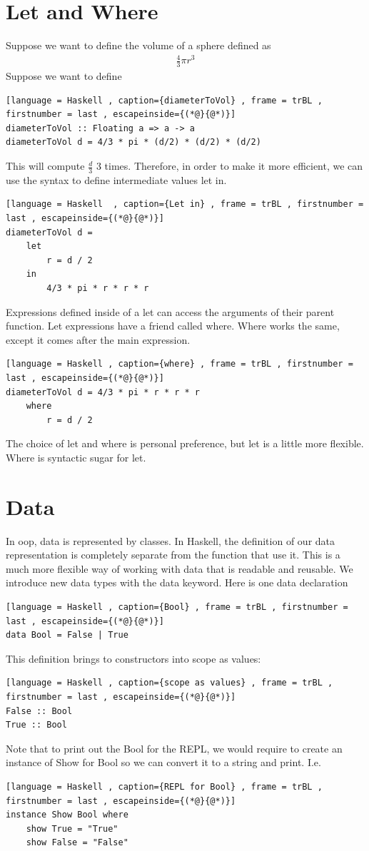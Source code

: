 \documentclass[a4paper]{article}
\theoremstyle{plain}
\theoremstyle{definition}
\theoremstyle{remark}
\begin{document}
\section{Let and Where}
Suppose we want to define the volume of a sphere defined as
\begin{align*}
	\frac{4}{3}\pi r^3
\end{align*}
Suppose we want to define
\begin{lstlisting}[language = Haskell , caption={diameterToVol} , frame = trBL , firstnumber = last , escapeinside={(*@}{@*)}]
diameterToVol :: Floating a => a -> a
diameterToVol d = 4/3 * pi * (d/2) * (d/2) * (d/2)
\end{lstlisting}
This will compute $\frac{d}{3}$ 3 times. Therefore, in order to make it more efficient, we can use the syntax to define intermediate values let in.
\begin{lstlisting}[language = Haskell  , caption={Let in} , frame = trBL , firstnumber = last , escapeinside={(*@}{@*)}]
diameterToVol d =
	let
		r = d / 2
	in
		4/3 * pi * r * r * r
\end{lstlisting}
Expressions defined inside of a let can access the arguments of their parent function. Let expressions have a friend called where. Where works the same, except it comes after the main expression.
\begin{lstlisting}[language = Haskell , caption={where} , frame = trBL , firstnumber = last , escapeinside={(*@}{@*)}]
diameterToVol d = 4/3 * pi * r * r * r
	where
		r = d / 2
\end{lstlisting}
The choice of let and where is personal preference, but let is a little more flexible. Where is syntactic sugar for let. 
\section{Data}
In oop, data is represented by classes. In Haskell, the definition of our data representation is completely separate from the function that use it. This is a much more flexible way of working with data that is readable and reusable. We introduce new data types with the data keyword. Here is one data declaration
\begin{lstlisting}[language = Haskell , caption={Bool} , frame = trBL , firstnumber = last , escapeinside={(*@}{@*)}]
data Bool = False | True
\end{lstlisting}
This definition brings to constructors into scope as values:
\begin{lstlisting}[language = Haskell , caption={scope as values} , frame = trBL , firstnumber = last , escapeinside={(*@}{@*)}]
False :: Bool
True :: Bool
\end{lstlisting}
Note that to print out the Bool for the REPL, we would require to create an instance of Show for Bool so we can convert it to a string and print. I.e.
\begin{lstlisting}[language = Haskell , caption={REPL for Bool} , frame = trBL , firstnumber = last , escapeinside={(*@}{@*)}]
instance Show Bool where
	show True = "True"
	show False = "False"
\end{lstlisting}
\end{document}
